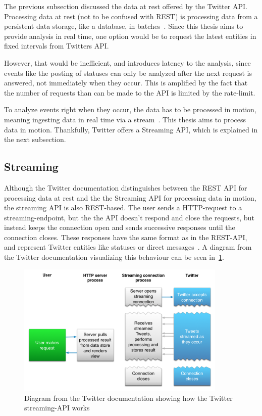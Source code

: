 The previous subsection discussed the data at rest offered by the Twitter API.
Processing data at rest (not to be confused with REST) is processing data from a persistent data storage, like a database, in batches~\cite{Nandi2015}.
Since this thesis aims to provide analysis in real time, one option would be to request the latest entities in fixed intervals from
Twitters API.
\par
However, that would be inefficient, and introduces latency to the analysis,
since events like the posting of statuses can only be analyzed after the next request is answered, not immediately when they occur.
This is amplified by the fact that the number of requests than can be made to the API is limited by the rate-limit.
\par
To analyze events right when they occur, the data has to be processed in motion, meaning ingesting data in real time via a stream~\cite{Nandi2015}.
This thesis aims to process data in motion.
Thankfully, Twitter offers a Streaming API, which is explained in the next subsection. %


\subsection{Streaming}
\label{subsec:streaming}

Although the Twitter documentation distinguishes between the REST API for processing data at rest and the the Streaming API for processing data in motion,
the streaming API is also REST-based.
The user sends a HTTP-request to a streaming-endpoint, but the the API doesn't respond and close the requests,
but instead keeps the connection open and sends successive responses until the connection closes.
These responses have the same format as in the REST-API, and represent Twitter entities like statuses or direct messages~\cite{twitterDocs}.
A diagram from the Twitter documentation visualizing this behaviour can be seen in~\ref{fig:twitter_streaming}.

\begin{figure}
    \centering
    \caption{Diagram from the Twitter documentation showing how the Twitter streaming-API works}
    \label{fig:twitter_streaming}
    \includegraphics[width=10cm]{../images/twitter_streaming_diagram.png}
\end{figure}


